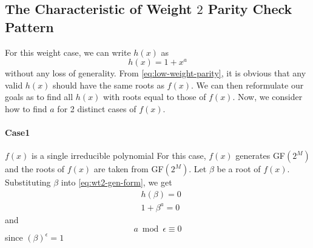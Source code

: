 \subsection{The Characteristic of Weight $2$ Parity Check Pattern}
For this weight case, we can write $h(x)$ as 
\begin{equation}
h(x)=1+x^a
\label{eq:wt2-gen-form}
\end{equation}
without any loss of generality. From \eqref{eq:low-weight-parity},  it is obvious that any valid $h(x)$ should have the same roots as $f(x)$. We can then reformulate our goals as to find all $h(x)$ with roots equal to those of $f(x)$. 
Now, we consider how to find $a$ for 2 distinct cases of $f(x)$.
\paragraph{ Case1} $f(x)$ is a single irreducible polynomial\newline
For this case, $f(x)$ generates GF$(2^M)$ and the roots of $f(x)$ are taken from GF$(2^M)$. Let $\beta$ be a root of $f(x)$. Substituting $\beta$ into \eqref{eq:wt2-gen-form}, we get 
\begin{equation}
\begin{split}
&h(\beta)=0\\
&1+\beta^a =0
\end{split}
\label{novelEq5b}
\end{equation}
and 
$$a \bmod \epsilon  \equiv 0$$
since $(\beta)^{\epsilon}=1$

